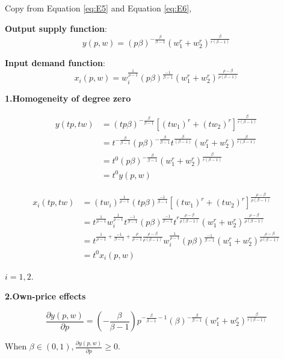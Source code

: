 \documentclass{article}
\begin{document}
Copy from Equation \ref{eq:E5}  and Equation \ref{eq:E6},

\textbf{Output supply function}:
$$
y(p,w) = (p\beta)^{-\frac{\beta}{\beta - 1}}(w_1^r + w_2^r)^{\frac{\beta}{r(\beta - 1)}}
$$

\textbf{Input demand function}:
$$
x_i(p,w) = w_i^{\frac{1}{\rho -1}}  (p\beta)^{\frac{-1}{\beta - 1}}(w_1^r + w_2^r)^{\frac{\rho -\beta}{\rho(\beta -1)}}
$$

\vspace{3mm}
\textbf{1.Homogeneity of degree zero}

\begin{align*}
y(tp,tw) &= (tp\beta)^{-\frac{\beta}{\beta - 1}}[(tw_1)^r + (tw_2)^r]^{\frac{\beta}{r(\beta - 1)}} \\
 &= t^{-\frac{\beta}{\beta - 1}}(p\beta)^{-\frac{\beta}{\beta - 1}} t^{\frac{\beta}{(\beta - 1)}} (w_1^r + w_2^r)^{\frac{\beta}{r(\beta - 1)}} \\
 &=t^0(p\beta)^{-\frac{\beta}{\beta - 1}}(w_1^r + w_2^r)^{\frac{\beta}{r(\beta - 1)}} \\
  &=t^0 y(p,w) 
\end{align*}

\begin{align*}
x_i(tp,tw) &= (tw_i)^{\frac{1}{\rho -1}}  (tp\beta)^{\frac{-1}{\beta - 1}}[(tw_1)^r + (tw_2)^r]^{\frac{\rho -\beta}{\rho(\beta -1)}} \\
&= t^{\frac{1}{\rho -1}} w_i^{\frac{1}{\rho -1}} t^{\frac{-1}{\beta -1}} (p\beta)^{\frac{-1}{\beta - 1}} t^{r\frac{\rho -\beta}{\rho(\beta -1)}} (w_1^r + w_2^r)^{\frac{\rho -\beta}{\rho(\beta -1)}} \\
 &=t^{\frac{1}{\rho -1} + \frac{-1}{\beta -1} + \frac{\rho}{\rho - 1}\frac{\rho -\beta}{\rho(\beta -1)}} w_i^{\frac{1}{\rho -1}}  (p\beta)^{\frac{-1}{\beta - 1}}(w_1^r + w_2^r)^{\frac{\rho -\beta}{\rho(\beta -1)}} \\
  &=t^0 x_i(p,w)
\end{align*}

$i = 1,2$.

\vspace{3mm}
\textbf{2.Own-price effects}

$$\frac{\partial y(p,w)}{\partial p} =(-\frac{\beta}{\beta - 1})p^{-\frac{\beta}{\beta - 1} - 1} (\beta)^{-\frac{\beta}{\beta - 1}}(w_1^r + w_2^r)^{\frac{\beta}{r(\beta - 1)}}$$

When $\beta \in (0,1), \frac{\partial y(p,w)}{\partial p} \ge 0$.
\end{document}
